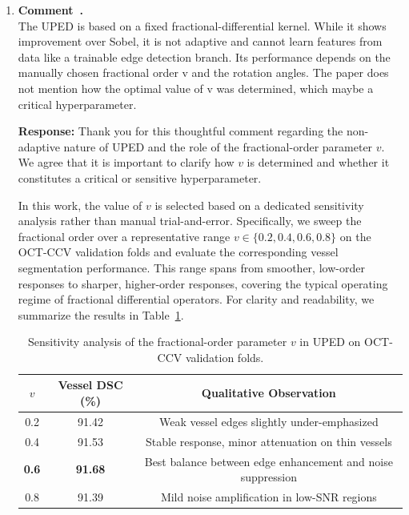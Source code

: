 \documentclass[11pt]{article}
\newcommand{\commentresponse}[2]{{\color{blue}\textbf{Response:} #2}}
\newcommand{\commentitem}{\item \textbf{Comment~\arabic{enumi}.}\\\ignorespaces}
\begin{document}
\begin{enumerate}
    \commentitem The UPED is based on a fixed fractional-differential kernel. While it shows improvement over Sobel, it is not adaptive and cannot learn features from data like a trainable edge detection branch. Its performance depends on the manually chosen fractional order v and the rotation angles. The paper does not mention how the optimal value of v was determined, which maybe a critical hyperparameter.
    
    \commentresponse{2}{
    Thank you for this thoughtful comment regarding the non-adaptive nature of UPED and the role of the fractional-order parameter $v$.
    We agree that it is important to clarify how $v$ is determined and whether it constitutes a critical or sensitive hyperparameter.
    
    In this work, the value of $v$ is selected based on a dedicated sensitivity analysis rather than manual trial-and-error.
    Specifically, we sweep the fractional order over a representative range $v\in\{0.2, 0.4, 0.6, 0.8\}$ on the OCT-CCV validation folds and evaluate the corresponding vessel segmentation performance.
    This range spans from smoother, low-order responses to sharper, higher-order responses, covering the typical operating regime of fractional differential operators.
    For clarity and readability, we summarize the results in Table~\ref{tab:v_sensitivity_1}.
    
    \begin{table}[h]
    \centering
    \caption{Sensitivity analysis of the fractional-order parameter $v$ in UPED on OCT-CCV validation folds.}
    \label{tab:v_sensitivity_1}
    \begin{tabular}{c c c}
    \hline
    $v$ & Vessel DSC (\%) & Qualitative Observation \\
    \hline
    0.2 & 91.42 & Weak vessel edges slightly under-emphasized \\
    0.4 & 91.53 & Stable response, minor attenuation on thin vessels \\
    \textbf{0.6} & \textbf{91.68} & Best balance between edge enhancement and noise suppression \\
    0.8 & 91.39 & Mild noise amplification in low-SNR regions \\
    \hline
    \end{tabular}
    \end{table}
    
}
\end{enumerate}
\end{document}
